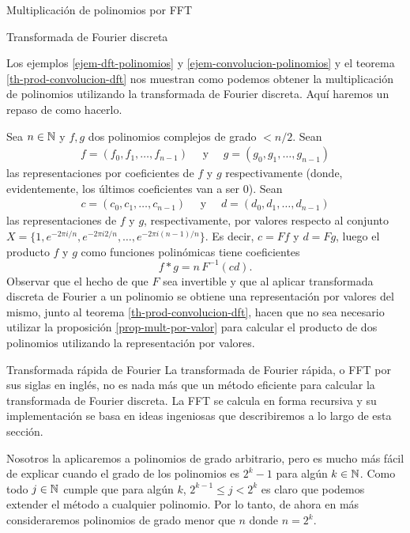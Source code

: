 \begin{chapter}{Multiplicación de polinomios por FFT}
\begin{section}{Transformada de Fourier discreta}
        \begin{ejemplo*} Los ejemplos \ref{ejem-dft-polinomios} y \ref{ejem-convolucion-polinomios} y  el teorema \ref{th-prod-convolucion-dft} nos  muestran como podemos obtener  la multiplicación de polinomios utilizando la transformada de Fourier discreta. Aquí haremos un repaso de como hacerlo.

            Sea $n \in \mathbb N$ y $f, g$ dos polinomios complejos de grado $< n/2$. Sean 
            \begin{align*}
                f = (f_0, f_1, \ldots, f_{n-1}) \quad \text{ y } \quad g = (g_0, g_1, \ldots, g_{n-1})
            \end{align*}
            las representaciones por coeficientes de $f$ y $g$ respectivamente (donde, evidentemente, los últimos coeficientes van a ser $0$). Sean 
            \begin{align*}
                c = (c_0, c_1, \ldots, c_{n-1}) \quad \text{ y } \quad d = (d_0, d_1, \ldots, d_{n-1})
            \end{align*}
            las representaciones de $f$ y $g$, respectivamente, por valores respecto al conjunto $X = \{1, e^{-2\pi i /{n}},e^{-2\pi i 2/{n}}, \ldots,e^{-2\pi i {(n-1)}/{n}} \}$. Es decir, $c = Ff$ y $d = Fg$,  luego el producto $f$ y $g$ como funciones polinómicas tiene coeficientes
            \begin{equation*}
                f * g = n\,  F^{-1}(cd). 
            \end{equation*}
            Observar que el hecho de que $F$ sea invertible y  que al aplicar transformada discreta de Fourier a un polinomio se obtiene una representación por valores del mismo, junto al teorema \ref{th-prod-convolucion-dft}, hacen que no sea necesario utilizar la proposición \ref{prop-mult-por-valor} para calcular el producto de dos polinomios utilizando la representación por valores. 
        \end{ejemplo*}
        
    \end{section}

    \begin{section}{Transformada rápida de Fourier} La transformada de Fourier rápida, o FFT por sus siglas en inglés, no es nada más que un método eficiente para calcular la transformada de Fourier discreta. La FFT se calcula en forma recursiva y su implementación se basa en ideas ingeniosas que describiremos a lo largo de esta sección. 

        Nosotros la aplicaremos a polinomios de grado arbitrario, pero es mucho más fácil de explicar cuando el grado de los polinomios es $2^k -1$  para algún $k \in \mathbb N$. Como todo $j \in \mathbb N$ cumple que para algún $k$, $2^{k-1} \le j < 2^k$ es claro que podemos extender el método a cualquier polinomio. Por lo tanto, de ahora en más consideraremos polinomios de grado menor que $n$ donde  $n = 2^k$. 


\end{section}
\end{chapter}
